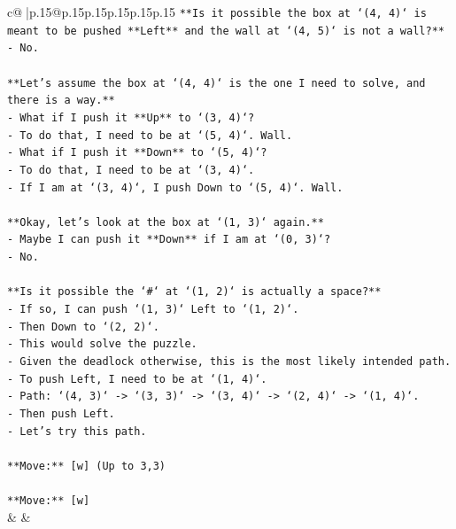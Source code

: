 \documentclass{article}
\begin{document}
{\begin{supertabular}{c@{$\;$}|p{.15\linewidth}@{}p{.15\linewidth}p{.15\linewidth}p{.15\linewidth}p{.15\linewidth}p{.15\linewidth}}
{{{\texttt{**Is it possible the box at `(4, 4)` is meant to be pushed **Left** and the wall at `(4, 5)` is not a wall?**} \\
\texttt{{-} No.} \\
\\ 
\texttt{**Let's assume the box at `(4, 4)` is the one I need to solve, and there is a way.**} \\
\texttt{{-} What if I push it **Up** to `(3, 4)`?} \\
\texttt{{-} To do that, I need to be at `(5, 4)`. Wall.} \\
\texttt{{-} What if I push it **Down** to `(5, 4)`?} \\
\texttt{{-} To do that, I need to be at `(3, 4)`.} \\
\texttt{{-} If I am at `(3, 4)`, I push Down to `(5, 4)`. Wall.} \\
\\ 
\texttt{**Okay, let's look at the box at `(1, 3)` again.**} \\
\texttt{{-} Maybe I can push it **Down** if I am at `(0, 3)`?} \\
\texttt{{-} No.} \\
\\ 
\texttt{**Is it possible the `\#` at `(1, 2)` is actually a space?**} \\
\texttt{{-} If so, I can push `(1, 3)` Left to `(1, 2)`.} \\
\texttt{{-} Then Down to `(2, 2)`.} \\
\texttt{{-} This would solve the puzzle.} \\
\texttt{{-} Given the deadlock otherwise, this is the most likely intended path.} \\
\texttt{{-} To push Left, I need to be at `(1, 4)`.} \\
\texttt{{-} Path: `(4, 3)` {-}> `(3, 3)` {-}> `(3, 4)` {-}> `(2, 4)` {-}> `(1, 4)`.} \\
\texttt{{-} Then push Left.} \\
\texttt{{-} Let's try this path.} \\
\\ 
\texttt{**Move:** {[}w{]} (Up to 3,3)} \\
\\ 
\texttt{**Move:** {[}w{]}} \\
            }
        }
    }
    & & \\ \\


\end{supertabular}}
\end{document}
